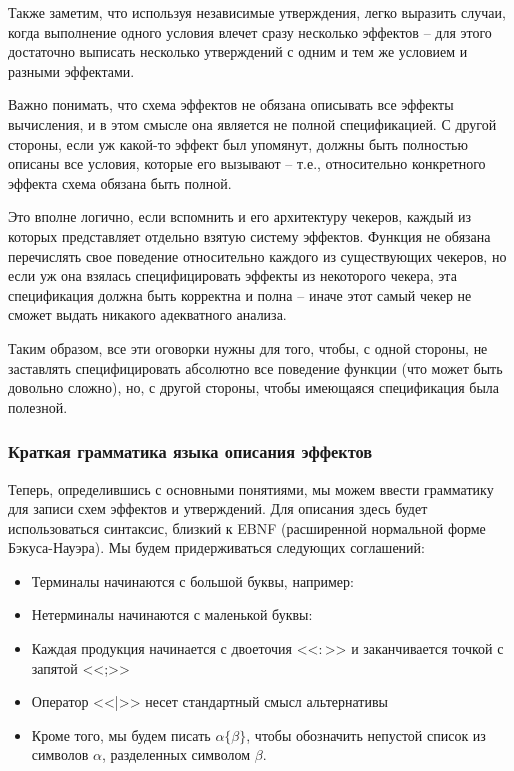 Также заметим, что используя независимые утверждения, легко выразить случаи, когда выполнение одного условия влечет сразу несколько эффектов -- для этого достаточно выписать несколько утверждений с одним и тем же условием и разными эффектами.

Важно понимать, что схема эффектов не обязана описывать все эффекты вычисления, и в этом смысле она является не полной спецификацией. С другой стороны, если уж какой-то эффект был упомянут, должны быть полностью описаны все условия, которые его вызывают -- т.е., относительно конкретного эффекта схема обязана быть полной.

Это вполне логично, если вспомнить  и его архитектуру чекеров, каждый из которых представляет отдельно взятую систему эффектов. Функция не обязана перечислять свое поведение относительно каждого из существующих чекеров, но если уж она взялась специфицировать эффекты из некоторого чекера, эта спецификация должна быть корректна и полна -- иначе этот самый чекер не сможет выдать никакого адекватного анализа.

Таким образом, все эти оговорки нужны для того, чтобы, с одной стороны, не заставлять специфицировать абсолютно все поведение функции (что может быть довольно сложно), но, с другой стороны, чтобы имеющаяся спецификация была полезной.




\subsubsection{Краткая грамматика языка описания эффектов}

Теперь, определившись с основными понятиями, мы можем ввести грамматику для записи схем эффектов и утверждений. 
Для описания здесь будет использоваться синтаксис, близкий к EBNF (расширенной нормальной форме Бэкуса-Науэра). Мы будем придерживаться следующих соглашений:

\begin{itemize}
    \item Терминалы начинаются с большой буквы, например: 
    
    \item Нетерминалы начинаются с маленькой буквы: 
    
    \item Каждая продукция начинается с двоеточия <<$\colon$>> и заканчивается точкой с запятой <<;>>
    
    \item Оператор <<|>> несет стандартный смысл альтернативы
    
    \item Кроме того, мы будем писать $\alpha \{ \beta \}$, чтобы обозначить непустой список из символов $\alpha$, разделенных символом $\beta$. 
\end{itemize}

